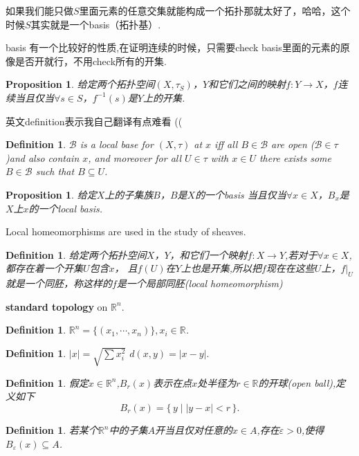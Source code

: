 \documentclass{article}
\newtheorem{proposition}[theorem]{Proposition}
\newtheorem{definition}[theorem]{Definition}
\newcommand*{\xfunc}[4]{{#2}\colon{#3}{#1}{#4}}
\newcommand*{\func}[3]{\xfunc{\to}{#1}{#2}{#3}}
\newcommand\Set[2]{\{\,#1\mid#2\,\}} %
\begin{document}
如果我们能只做$S$里面元素的任意交集就能构成一个拓扑那就太好了，哈哈，这个时候$S$其实就是一个basis（拓扑基）.

basis 有一个比较好的性质,在证明连续的时候，只需要check basis里面的元素的原像是否开就行，不用check所有的开集.

\begin{proposition}
给定两个拓扑空间$(X,\tau_S)$，$Y$和它们之间的映射$\func{f}{Y}{X}$，$f$连续当且仅当$\forall s \in S$，$f^{-1}(s)$是$Y$上的开集.
\end{proposition}

英文definition表示我自己翻译有点难看 ((

\begin{definition}
\rm $\mathcal{B}$ is a local base for $(X,\tau)$ at $x$ iff all $B \in \mathcal{B}$ are open ($\mathcal{B} \in \tau$)and also contain $x$, and moreover for all $U \in \tau$ with $x \in U$ there exists some $B \in \mathcal{B}$ such that $B \subseteq U$.
\end{definition}


\begin{proposition}
给定$X$上的子集族$B$，$B$是$X$的一个basis 当且仅当$\forall x \in X$，$B_x$是$X$上$x$的一个local basis.
\end{proposition}

Local homeomorphisms are used in the study of sheaves.

\begin{definition}
\rm 给定两个拓扑空间$X$，$Y$，和它们一个映射$\func{f}{X}{Y}$,若对于$\forall x \in X$,都存在着一个开集$U$包含$x$， 且$f(U)$在$Y$上也是开集,所以把$f$现在在这些$U$上，$f|_U$就是一个同胚，称这样的$f$是一个局部同胚(local homeomorphism)
\end{definition}

\textbf{standard topology} on $\mathbb{R}^n$.
\begin{definition}
$\mathbb{R}^n = \{(x_1,\cdots,x_n)\},x_i \in \mathbb{R}$.
\end{definition}

\begin{definition}
$|x| = \sqrt{\sum x_i^2}$ $d(x,y)=|x-y|.$
\end{definition}

\begin{definition}
\rm 假定$x \in \mathbb{R}^n$,$B_r(x)$表示在点$x$处半径为$r \in \mathbb{R}$的开球(open ball),定义如下\[B_r(x)=\Set{y}{|y-x| < r}.\]
\end{definition}

\begin{definition}
若某个$\mathbb{R}^n$中的子集$A$开当且仅对任意的$x \in A$,存在$\varepsilon > 0$,使得$B_\varepsilon(x) \subseteq A$.
\end{definition}
\end{document}
